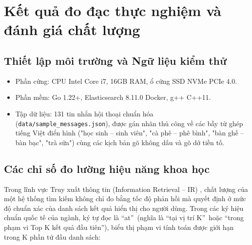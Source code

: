 \documentclass[12pt,a4paper,oneside]{report}
\begin{document}
\section{Kết quả đo đạc thực nghiệm và đánh giá chất lượng}

\subsection{Thiết lập môi trường và Ngữ liệu kiểm thử}
\begin{itemize}
    \item Phần cứng: CPU Intel Core i7, 16GB RAM, ổ cứng SSD NVMe PCIe 4.0.
    \item Phần mềm: Go 1.22+, Elasticsearch 8.11.0 Docker, g++ C++11.
    \item Tập dữ liệu: 131 tin nhắn hội thoại chuẩn hóa (\texttt{data/sample\_messages.json}), được gán nhãn thủ công về các bẫy từ ghép tiếng Việt điển hình ("học sinh -- sinh viên", "cà phê -- phê bình", "bàn ghế -- bàn bạc", "trà sữa") cùng các kịch bản gõ không dấu và gõ dở tiền tố.
\end{itemize}

\subsection{Các chỉ số đo lường hiệu năng khoa học}
Trong lĩnh vực Truy xuất thông tin (Information Retrieval -- IR) \cite{ref1}, chất lượng của một hệ thống tìm kiếm không chỉ đo bằng tốc độ phản hồi mà quyết định ở mức độ chuẩn xác của danh sách kết quả hiển thị cho người dùng. Trong các ký hiệu chuẩn quốc tế của ngành, ký tự  đọc là \textquotedblleft at\textquotedblright\ (nghĩa là \textquotedblleft tại vị trí K\textquotedblright\ hoặc \textquotedblleft trong phạm vi Top K kết quả đầu tiên\textquotedblright), biểu thị phạm vi tính toán được giới hạn trong K phần tử đầu danh sách:
\end{document}
